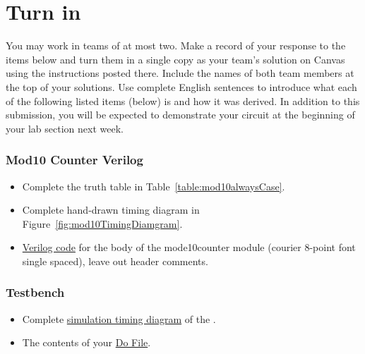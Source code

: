 \section{Turn in}

You may work in teams of at most two. Make a record of your response to
the items below and turn them in a single copy as your team's solution
on Canvas using the instructions posted there. Include the names of both
team members at the top of your solutions. Use complete English
sentences to introduce what each of the following listed items (below)
is and how it was derived. In addition to this submission, you will be
expected to demonstrate your circuit at the beginning of your lab
section next week.

\subsubsection{Mod10 Counter Verilog}

\begin{itemize}
    \item
        Complete the truth table in Table~\ref{table:mod10alwaysCase}.
    \item
        Complete hand-drawn timing diagram in Figure~\ref{fig:mod10TimingDiamgram}.
    \item
        \hyperlink{link:mod10Verilog}{Verilog code} for the body of the mode10counter module (courier 8-point
        font single spaced), leave out header comments.
\end{itemize}

\subsubsection{Testbench}
\begin{itemize}
    \item
        Complete \hyperlink{link:mod10Simulation}{simulation timing diagram} of the .
    \item
        The contents of your   \hyperlink{link:mod10Simulation}{Do File}.
\end{itemize}
